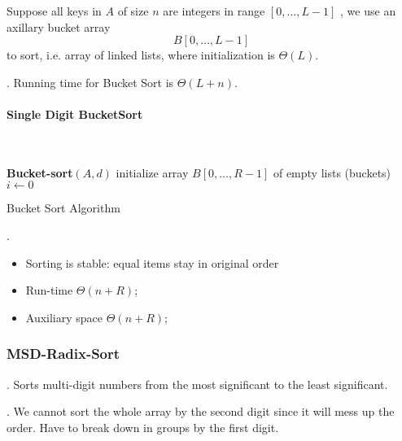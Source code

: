 \documentclass{article}
\begin{document}
Suppose all keys in $A$ of size $n$ are integers in range $[0, \ldots, L-1]$ , we use an axillary bucket array 
\[ B[0, \ldots, L-1] \] 
to sort, i.e. array of linked lists, where initialization is $\Theta(L)$. 

\begin{thmm}[].
    Running time for Bucket Sort is $\Theta(L + n)$. 
\end{thmm}

\paragraph{Single Digit BucketSort} \phantom{text} \\
\begin{algorithm}[H]
    \DontPrintSemicolon  
    \BlankLine
    
    \textbf{Bucket-sort$(A, d)$}\;
    initialize array $B[0, \ldots, R-1]$ of empty lists (buckets)\;
    $i \leftarrow 0$\;
    \caption{Bucket Sort Algorithm}
\end{algorithm}

\begin{discovery}[].
    \begin{itemize}
        \item Sorting is stable: equal items stay in original order 
        \item Run-time $\Theta(n + R)$; 
        \item Auxiliary space $\Theta(n + R)$; 
    \end{itemize}
\end{discovery}

\subsubsection{MSD-Radix-Sort} 

\begin{algo}[].
    Sorts multi-digit numbers from the most significant to the least significant. 
    \begin{comm}[].
        We cannot sort the whole array by the second digit since it will mess up the order. Have to break down in groups by the first digit. 
    \end{comm}
\end{algo}
\end{document}
